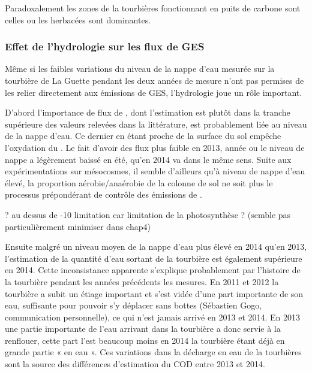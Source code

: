 Paradoxalement les zones de la tourbières fonctionnant en puits de carbone sont celles ou les herbacées sont dominantes.

\subsubsection{Effet de l'hydrologie sur les flux de GES}

Même si les faibles variations du niveau de la nappe d'eau mesurée sur la tourbière de La Guette pendant les deux années de mesure n'ont pas permises de les relier directement aux émissions de GES, l'hydrologie joue un rôle important.

D'abord l'importance de flux de \chh, dont l'estimation est plutôt dans la tranche supérieure des valeurs relevées dans la littérature, est probablement liée au niveau de la nappe d'eau.
Ce dernier en étant proche de la surface du sol empêche l'oxydation du \chh.
Le fait d'avoir des flux plus faible en 2013, année ou le niveau de nappe a légèrement baissé en été, qu'en 2014 va dans le même sens.
Suite aux expérimentations sur mésocosmes, il semble d'ailleurs qu'à niveau de nappe d'eau élevé, la proportion aérobie/anaérobie de la colonne de sol ne soit plus le processus prépondérant de contrôle des émissions de \chh.

? au dessus de -10 limitation car limitation de la photosynthèse ? (semble pas particulièrement minimiser dans chap4)

Ensuite malgré un niveau moyen de la nappe d'eau plus élevé en 2014 qu'en 2013, l'estimation de la quantité d'eau sortant de la tourbière est également supérieure en 2014.
Cette inconsistance apparente s'explique probablement par l'histoire de la tourbière pendant les années précédents les mesures.
En 2011 et 2012 la tourbière a subit un étiage important et s'est vidée d'une part importante de son eau, suffisante pour pouvoir s'y déplacer sans bottes (Sébastien Gogo, communication personnelle), ce qui n'est jamais arrivé en 2013 et 2014.
En 2013 une partie importante de l'eau arrivant dans la tourbière a donc servie à la renflouer, cette part l'est beaucoup moins en 2014 la tourbière étant déjà en grande partie « en eau ».
Ces variations dans la décharge en eau de la tourbières sont la source des différences d'estimation du COD entre 2013 et 2014.

